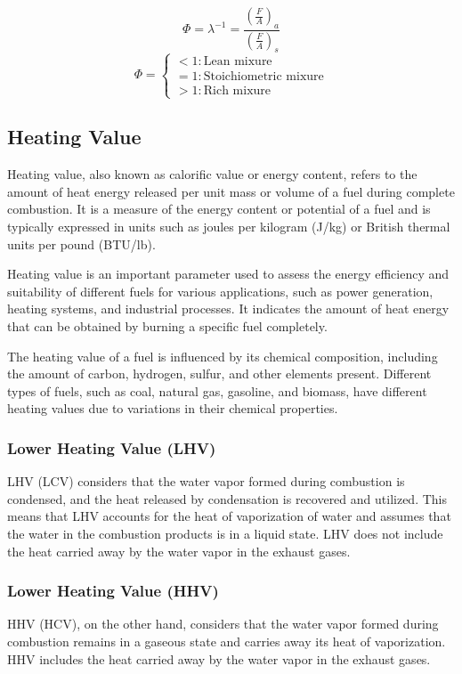\documentclass{article}
\begin{document}
$$\Phi = \lambda^{-1} = \frac{\left(\frac{F}{A}\right)_a}{\left(\frac{F}{A}\right)_s}$$
$$\Phi = \begin{cases}
  < 1 : \text{Lean mixure} \\
  = 1 : \text{Stoichiometric mixure} \\
  > 1 : \text{Rich mixure} 
\end{cases}$$

\subsection*{Heating Value}
Heating value, also known as calorific value or energy content, refers to the amount of heat energy released per unit mass or volume of a fuel during complete combustion. It is a measure of the energy content or potential of a fuel and is typically expressed in units such as joules per kilogram (J/kg) or British thermal units per pound (BTU/lb).

Heating value is an important parameter used to assess the energy efficiency and suitability of different fuels for various applications, such as power generation, heating systems, and industrial processes. It indicates the amount of heat energy that can be obtained by burning a specific fuel completely.

The heating value of a fuel is influenced by its chemical composition, including the amount of carbon, hydrogen, sulfur, and other elements present. Different types of fuels, such as coal, natural gas, gasoline, and biomass, have different heating values due to variations in their chemical properties.

\subsubsection*{Lower Heating Value (LHV)}
LHV (LCV) considers that the water vapor formed during combustion is condensed, and the heat released by condensation is recovered and utilized. This means that LHV accounts for the heat of vaporization of water and assumes that the water in the combustion products is in a liquid state. LHV does not include the heat carried away by the water vapor in the exhaust gases.

\subsubsection*{Lower Heating Value (HHV)}
HHV (HCV), on the other hand, considers that the water vapor formed during combustion remains in a gaseous state and carries away its heat of vaporization. HHV includes the heat carried away by the water vapor in the exhaust gases.
\end{document}
